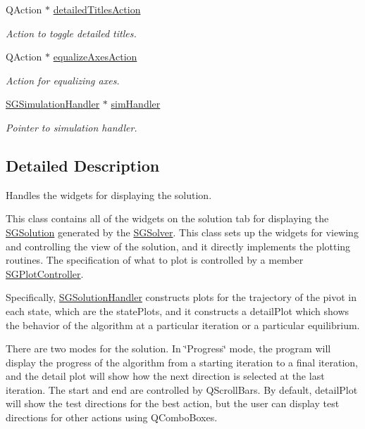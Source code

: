 \begin{DoxyCompactItemize}
Q\+Action $\ast$ \hyperlink{classSGSolutionHandler_a96449b0e5785c0de1ce9797df2f3dab1}{detailed\+Titles\+Action}
\begin{DoxyCompactList}\small\item\em Action to toggle detailed titles. \end{DoxyCompactList}\item 
\mbox{\label{classSGSolutionHandler_ae3756fd911beba2ce1482c3d439ce40e}} 
Q\+Action $\ast$ \hyperlink{classSGSolutionHandler_ae3756fd911beba2ce1482c3d439ce40e}{equalize\+Axes\+Action}
\begin{DoxyCompactList}\small\item\em Action for equalizing axes. \end{DoxyCompactList}\item 
\mbox{\label{classSGSolutionHandler_a99750347e515bb8b7469e018226868cb}} 
\hyperlink{classSGSimulationHandler}{S\+G\+Simulation\+Handler} $\ast$ \hyperlink{classSGSolutionHandler_a99750347e515bb8b7469e018226868cb}{sim\+Handler}
\begin{DoxyCompactList}\small\item\em Pointer to simulation handler. \end{DoxyCompactList}\end{DoxyCompactItemize}


\subsection{Detailed Description}
Handles the widgets for displaying the solution. 

This class contains all of the widgets on the solution tab for displaying the \hyperlink{classSGSolution}{S\+G\+Solution} generated by the \hyperlink{classSGSolver}{S\+G\+Solver}. This class sets up the widgets for viewing and controlling the view of the solution, and it directly implements the plotting routines. The specification of what to plot is controlled by a member \hyperlink{classSGPlotController}{S\+G\+Plot\+Controller}.

Specifically, \hyperlink{classSGSolutionHandler}{S\+G\+Solution\+Handler} constructs plots for the trajectory of the pivot in each state, which are the state\+Plots, and it constructs a detail\+Plot which shows the behavior of the algorithm at a particular iteration or a particular equilibrium.

There are two modes for the solution. In \char`\"{}\+Progress\char`\"{} mode, the program will display the progress of the algorithm from a starting iteration to a final iteration, and the detail plot will show how the next direction is selected at the last iteration. The start and end are controlled by Q\+Scroll\+Bars. By default, detail\+Plot will show the test directions for the best action, but the user can display test directions for other actions using Q\+Combo\+Boxes.

